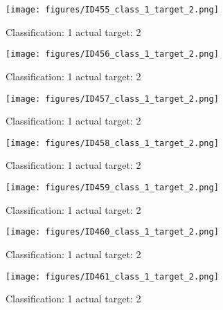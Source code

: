 \begin{figure}[h!]
\begin{center}
\texttt{[image: figures/ID455\_class\_1\_target\_2.png]}
\end{center}
\caption{ Classification: 1 actual target: 2}
\label{fig:ID455_class_1_target_2}
\end{figure}
\begin{figure}[h!]
\begin{center}
\texttt{[image: figures/ID456\_class\_1\_target\_2.png]}
\end{center}
\caption{ Classification: 1 actual target: 2}
\label{fig:ID456_class_1_target_2}
\end{figure}
\begin{figure}[h!]
\begin{center}
\texttt{[image: figures/ID457\_class\_1\_target\_2.png]}
\end{center}
\caption{ Classification: 1 actual target: 2}
\label{fig:ID457_class_1_target_2}
\end{figure}
\begin{figure}[h!]
\begin{center}
\texttt{[image: figures/ID458\_class\_1\_target\_2.png]}
\end{center}
\caption{ Classification: 1 actual target: 2}
\label{fig:ID458_class_1_target_2}
\end{figure}
\begin{figure}[h!]
\begin{center}
\texttt{[image: figures/ID459\_class\_1\_target\_2.png]}
\end{center}
\caption{ Classification: 1 actual target: 2}
\label{fig:ID459_class_1_target_2}
\end{figure}
\begin{figure}[h!]
\begin{center}
\texttt{[image: figures/ID460\_class\_1\_target\_2.png]}
\end{center}
\caption{ Classification: 1 actual target: 2}
\label{fig:ID460_class_1_target_2}
\end{figure}
\begin{figure}[h!]
\begin{center}
\texttt{[image: figures/ID461\_class\_1\_target\_2.png]}
\end{center}
\caption{ Classification: 1 actual target: 2}
\label{fig:ID461_class_1_target_2}
\end{figure}
